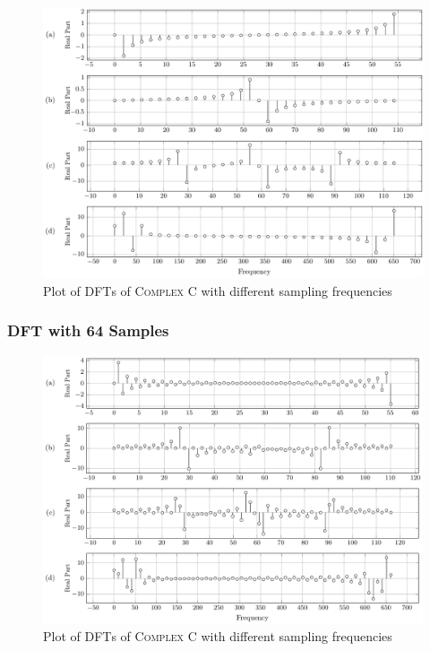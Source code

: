 \documentclass[../../course]{subfiles}
\begin{document}
\begin{figure} [H]
    \centering
     {
        \includegraphics[height = 0.8\textheight] {tikzpics/plotDftComplexC32.pdf}
    }
     {Plot of \textsc{DFT}s of \textsc{Complex C} with different sampling frequencies}
    \label{plt:dftComplexC}
\end{figure}

\subsubsection{DFT with 64 Samples}

\vfill

\begin{figure} [H]
    \centering
     {
        \includegraphics[height = 0.8\textheight] {tikzpics/plotDftComplexC64.pdf}
    }
     {Plot of \textsc{DFT}s of \textsc{Complex C} with different sampling frequencies}
    \label{plt:dftComplexC}
\end{figure}
\end{document}
